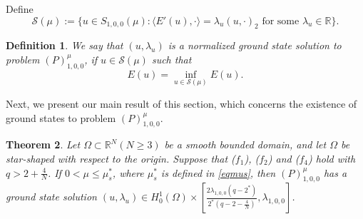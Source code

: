 \documentclass[11pt]{amsart}
\newtheorem{theorem}{Theorem}[section]
\newtheorem{definition}[theorem]{Definition}
\newcommand{\abs}[1]{\lvert#1\rvert}
\newcommand{\R}{\mathbb{R}}
\numberwithin{equation}{section}
\begin{document}

Define
$$
\mathcal{S}(\mu):=\{u \in S_{1,0,0}(\mu):\langle E'(u),\cdot \rangle=\lambda_u (u,\cdot)_2\text{ for some } \lambda_u \in \R \}.
$$
\begin{definition}\label{defgs}
     We say that $(u, \lambda_u)$ is a normalized ground state solution to problem $(P)^{\mu}_{1,0,0}$, if $u \in \mathcal{S}(\mu)$ such that
     $$E(u) = \inf_{u \in \mathcal{S}(\mu)}E(u).$$
\end{definition}
Next, we present our main result of this section, which concerns the existence of ground states to problem $(P)^{\mu}_{1,0,0}$.
\begin{theorem}\label{thgs}
    Let $\Omega\subset \mathbb{R}^N(N \geq 3)$ be a smooth bounded  domain,  and let $\Omega$ be star-shaped with respect to the origin. Suppose that ($f_1$), ($f_2$) and ($f_4$) hold with $q > 2+\frac{4}{N}$.
If $0<\mu \leq \mu^*_s$, where $\mu^*_s$ is defined in \eqref{eqmus}, then $(P)^{\mu}_{1,0,0}$ has a ground state solution $(u,\lambda_u) \in H^1_0(\Omega) \times \left[\frac{2\lambda_{1,0,0}(q-2^*)}{2^*(q-2-\frac{4}{N})},\lambda_{1,0,0}\right]$.
\end{theorem}
\end{document}
